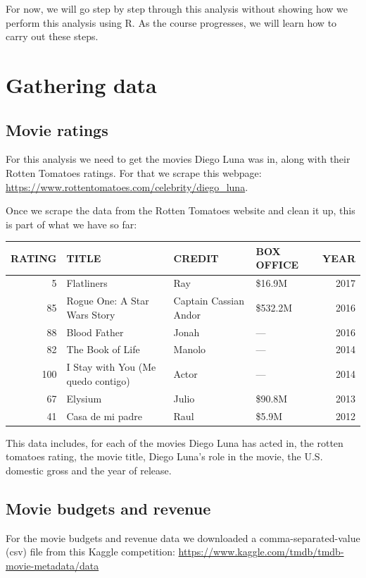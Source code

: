 \documentclass[12pt,]{book}
\theoremstyle{definition}
\theoremstyle{definition}
\theoremstyle{definition}
\theoremstyle{remark}
\begin{document}
For now, we will go step by step through this analysis without showing
how we perform this analysis using R. As the course progresses, we will
learn how to carry out these steps.

\section{Gathering data}\label{gathering-data}

\subsection{Movie ratings}\label{movie-ratings}

For this analysis we need to get the movies Diego Luna was in, along
with their Rotten Tomatoes ratings. For that we scrape this webpage:
\url{https://www.rottentomatoes.com/celebrity/diego_luna}.

Once we scrape the data from the Rotten Tomatoes website and clean it
up, this is part of what we have so far:

\begin{tabular}{r|l|l|l|r}
\hline
RATING & TITLE & CREDIT & BOX OFFICE & YEAR\\
\hline
5 & Flatliners & Ray & \$16.9M & 2017\\
\hline
85 & Rogue One: A Star Wars Story & Captain Cassian Andor & \$532.2M & 2016\\
\hline
88 & Blood Father & Jonah & — & 2016\\
\hline
82 & The Book of Life & Manolo & — & 2014\\
\hline
100 & I Stay with You (Me quedo contigo) & Actor & — & 2014\\
\hline
67 & Elysium & Julio & \$90.8M & 2013\\
\hline
41 & Casa de mi padre & Raul & \$5.9M & 2012\\
\hline
\end{tabular}

This data includes, for each of the movies Diego Luna has acted in, the
rotten tomatoes rating, the movie title, Diego Luna's role in the movie,
the U.S. domestic gross and the year of release.

\subsection{Movie budgets and revenue}\label{movie-budgets-and-revenue}

For the movie budgets and revenue data we downloaded a
comma-separated-value (csv) file from this Kaggle competition:
\url{https://www.kaggle.com/tmdb/tmdb-movie-metadata/data}
\end{document}

